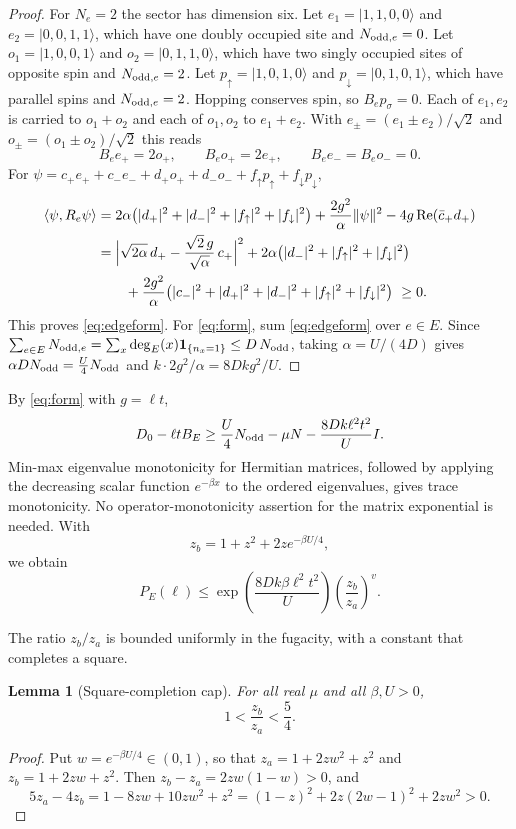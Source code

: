 \documentclass[11pt]{article}
\newtheorem{lemma}{Lemma}
\begin{document}
\begin{proof}
For $N_e=2$ the sector has dimension six. Let $e_1=|1,1,0,0\rangle$ and $e_2=|0,0,1,1\rangle$, which have one doubly occupied site and $N_{{\rm odd},e}=0$. Let $o_1=|1,0,0,1\rangle$ and $o_2=|0,1,1,0\rangle$, which have two singly occupied sites of opposite spin and $N_{{\rm odd},e}=2$. Let $p_\uparrow=|1,0,1,0\rangle$ and $p_\downarrow=|0,1,0,1\rangle$, which have parallel spins and $N_{{\rm odd},e}=2$. Hopping conserves spin, so $B_ep_\sigma=0$. Each of $e_1,e_2$ is carried to $o_1+o_2$ and each of $o_1,o_2$ to $e_1+e_2$. With $e_\pm=(e_1\pm e_2)/\sqrt2$ and $o_\pm=(o_1\pm o_2)/\sqrt2$ this reads
\[
 B_ee_+=2o_+,\qquad B_eo_+=2e_+,\qquad B_ee_-=B_eo_-=0.
\]
For $\psi=c_+e_++c_-e_-+d_+o_++d_-o_-+f_\uparrow p_\uparrow+f_\downarrow p_\downarrow$,
\begin{align*}
 \langle\psi,R_e\psi\rangle
 &=2\alpha\bigl(|d_+|^2+|d_-|^2+|f_\uparrow|^2+|f_\downarrow|^2\bigr)
 +\frac{2g^2}{\alpha}\|\psi\|^2-4g\,\mathrm{Re}(\bar c_+d_+)\\
 &=\Bigl|\sqrt{2\alpha}\,d_+-\frac{\sqrt2\,g}{\sqrt\alpha}\,c_+\Bigr|^2
 +2\alpha\bigl(|d_-|^2+|f_\uparrow|^2+|f_\downarrow|^2\bigr)\\
 &\qquad+\frac{2g^2}{\alpha}\bigl(|c_-|^2+|d_+|^2+|d_-|^2+|f_\uparrow|^2+|f_\downarrow|^2\bigr)\ \ge0.
\end{align*}
This proves \eqref{eq:edgeform}. For \eqref{eq:form}, sum \eqref{eq:edgeform} over $e\in E$. Since $\sum_{e\in E}N_{{\rm odd},e}=\sum_x\deg_E(x)\mathbf 1_{\{n_x=1\}}\le D\,N_{\rm odd}$, taking $\alpha=U/(4D)$ gives $\alpha D N_{\rm odd}=\tfrac U4N_{\rm odd}$ and $k\cdot2g^2/\alpha=8Dkg^2/U$.
\end{proof}

By \eqref{eq:form} with $g=\ell t$,
\[
 D_0-\ell tB_E\ge \frac U4N_{\rm odd}-\mu N-\frac{8Dk\ell^2t^2}{U}I.
\]
Min-max eigenvalue monotonicity for Hermitian matrices, followed by applying the decreasing scalar function $e^{-\beta x}$ to the ordered eigenvalues, gives trace monotonicity. No operator-monotonicity assertion for the matrix exponential is needed. With
\[
 z_b=1+z^2+2ze^{-\beta U/4},
\]
we obtain
\begin{equation}\label{eq:tracebound}
 P_E(\ell)\le \exp\!\left(\frac{8Dk\beta\ell^2t^2}{U}\right)
 \left(\frac{z_b}{z_a}\right)^v.
\end{equation}

The ratio $z_b/z_a$ is bounded uniformly in the fugacity, with a constant that completes a square.
\begin{lemma}[Square-completion cap]\label{lem:cap}
For all real $\mu$ and all $\beta,U>0$,
\begin{equation}\label{eq:fugacity}
 1<\frac{z_b}{z_a}<\frac54.
\end{equation}
\end{lemma}
\begin{proof}
Put $w=e^{-\beta U/4}\in(0,1)$, so that $z_a=1+2zw^2+z^2$ and $z_b=1+2zw+z^2$. Then $z_b-z_a=2zw(1-w)>0$, and
\[
 5z_a-4z_b=1-8zw+10zw^2+z^2=(1-z)^2+2z(2w-1)^2+2zw^2>0.
\]
\end{proof}
\end{document}
